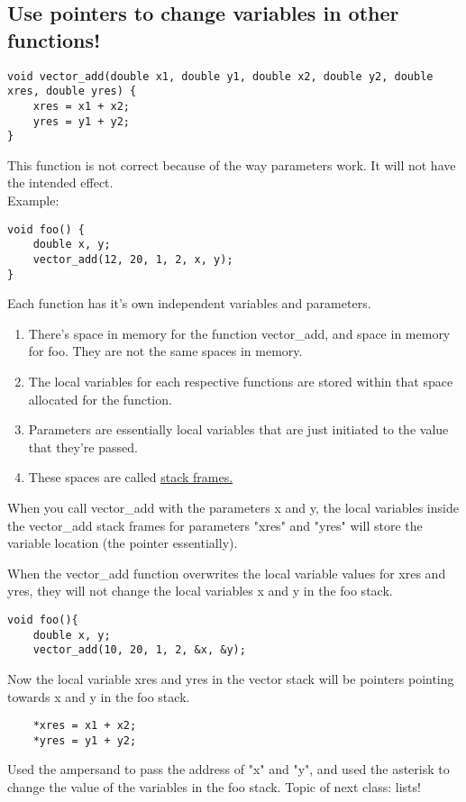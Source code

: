 \documentclass[12pt]{article}
\theoremstyle{definition}
\begin{document}
\subsection{Use pointers to change variables in other functions!}
\begin{lstlisting}
void vector_add(double x1, double y1, double x2, double y2, double xres, double yres) {
    xres = x1 + x2;
    yres = y1 + y2;
}
\end{lstlisting}
This function is not correct because of the way parameters work. It will not have the intended effect. 
\\ 
Example: 
\begin{lstlisting}
void foo() {
    double x, y;
    vector_add(12, 20, 1, 2, x, y);
}
\end{lstlisting}
\note Each function has it's own independent variables and parameters. 
\begin{enumerate}
    \item There's space in memory for the function vector\_add, and space in memory for foo. They are not the same spaces in memory. 
    \item The local variables for each respective functions are stored within that space allocated for the function.
    \item Parameters are essentially local variables that are just initiated to the value that they're passed. 
    \item These spaces are called \href{https://www.techopedia.com/definition/22304/stack-frame}{stack frames.}
\end{enumerate}
When you call vector\_add with the parameters x and y, the local variables inside the vector\_add stack frames for parameters "xres" and "yres" will store the variable location (the pointer essentially). 

When the vector\_add function overwrites the local variable values for xres and yres, they will not change the local variables x and y in the foo stack. 
\begin{lstlisting}
void foo(){
    double x, y;
    vector_add(10, 20, 1, 2, &x, &y);
\end{lstlisting}
\note Now the local variable xres and yres in the vector stack will be pointers pointing towards x and y in the foo stack. 

\begin{lstlisting}
    *xres = x1 + x2;
    *yres = y1 + y2;
\end{lstlisting}   
\note Used the ampersand to pass the address of "x" and "y", and used the asterisk to change the value of the variables in the foo stack.
\note Topic of next class: lists! 
\end{document}
